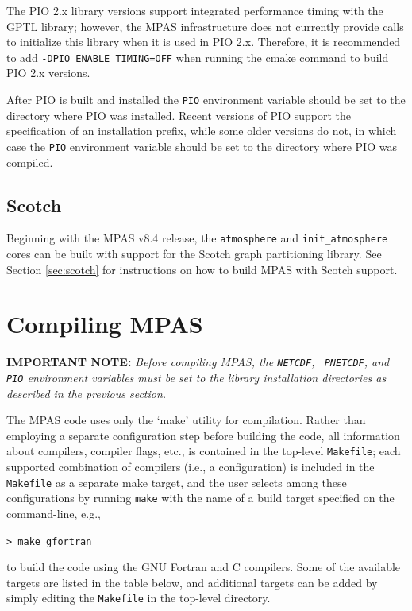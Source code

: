The PIO 2.x library versions support integrated performance timing with the GPTL library; however,
the MPAS infrastructure does not currently provide calls to initialize this library when it is used in PIO 2.x.
Therefore, it is recommended to add {\tt -DPIO\_ENABLE\_TIMING=OFF} when running the cmake command
to build PIO 2.x versions.

After PIO is built and installed the {\tt PIO} environment variable should be set to 
the directory where PIO was installed. Recent versions of PIO support the specification of an installation
prefix, while some older versions do not, in which case the {\tt PIO} environment variable should
be set to the directory where PIO was compiled.

\subsection{Scotch}
\label{scotch_build}
Beginning with the MPAS v8.4 release, the {\tt atmosphere} and {\tt init\_atmosphere} cores can be built with
support for the Scotch graph partitioning library. See Section \ref{sec:scotch} for instructions on
how to build MPAS with Scotch support.

\section{Compiling MPAS}
\label{compiling_MPAS}

{\bf IMPORTANT NOTE:} {\em Before compiling MPAS, the {\tt NETCDF}, {\tt
PNETCDF}, and {\tt PIO} environment variables must be set to the library
installation directories as described in the previous section.} \vspace{12pt}

The MPAS code uses only the `make' utility for compilation. Rather than
employing a separate configuration step before building the code, all
information about compilers, compiler flags, etc., is contained in the top-level
{\tt Makefile}; each supported combination of compilers (i.e., a configuration)
is included in the {\tt Makefile} as a separate make target, and the user
selects among these configurations by running {\tt make} with the name of a
build target specified on the command-line, e.g.,

\vspace{12pt}
{\tt > make gfortran}
\vspace{12pt}

\noindent to build the code using the GNU Fortran and C compilers. Some of the
available targets are listed in the table below, and additional targets can be
added by simply editing the {\tt Makefile} in the top-level directory.

